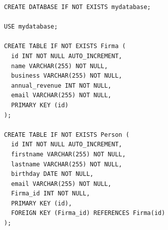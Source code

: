 \documentclass{article}
\begin{document}
\clearpage

\begin{lstlisting}[caption=SQL Script für die Datenbank]
CREATE DATABASE IF NOT EXISTS mydatabase;

USE mydatabase;

CREATE TABLE IF NOT EXISTS Firma (
  id INT NOT NULL AUTO_INCREMENT,
  name VARCHAR(255) NOT NULL,
  business VARCHAR(255) NOT NULL,
  annual_revenue INT NOT NULL,
  email VARCHAR(255) NOT NULL,
  PRIMARY KEY (id)
);

CREATE TABLE IF NOT EXISTS Person (
  id INT NOT NULL AUTO_INCREMENT,
  firstname VARCHAR(255) NOT NULL,
  lastname VARCHAR(255) NOT NULL,
  birthday DATE NOT NULL,
  email VARCHAR(255) NOT NULL,
  Firma_id INT NOT NULL,
  PRIMARY KEY (id),
  FOREIGN KEY (Firma_id) REFERENCES Firma(id)
);
\end{lstlisting}
\end{document}
